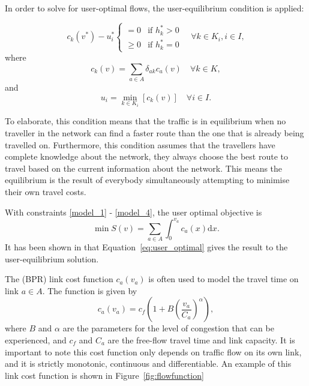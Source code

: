 In order to solve for user-optimal flows,
the \citep{Wardrop} user-equilibrium condition is applied:

\begin{equation} \label{wardrop1}
    c_k(v^{\ast}) - u_i^{\ast} 
    \begin{cases}
        =0 & \text{if } h_k^{\ast} > 0 \\
        \geq 0 & \text{if } h_k^{\ast} = 0
    \end{cases}
    \quad \forall k \in K_i, i \in I,
\end{equation}
where 
\begin{equation}
    c_k(v) = \sum_{a \in A} \delta_{ak} c_a(v) \quad \forall k \in K,
\end{equation}
and
\begin{equation} \label{wardrop3}
    u_i = \min_{k \in K_i} \left[ c_k(v) \right] \quad \forall i \in I.
\end{equation}

To elaborate, this condition means that the traffic is in equilibrium when no traveller in the network can find a faster route than the one that is already being travelled on.
Furthermore, this condition assumes that the travellers have complete knowledge about the network,
they always choose the best route to travel based on the current information about the network.
This means the equilibrium is the result of everybody simultaneously attempting to minimise their own travel costs.

With constraints \eqref{model_1} - \eqref{model_4},
the user optimal objective is
\begin{equation} \label{eq:user_optimal}
    \min S(v) = \sum_{a\in A} \int_0^{v_a} c_a(x) \mathrm{d} x.
\end{equation}
It has been shown in \citet{Florian} that Equation~\ref{eq:user_optimal} gives the result to the user-equilibrium solution.

The \citet{BPR} (BPR) link cost function
$c_a(v_a)$ is often used to model the travel time on link $a \in A$.
The function is given by
\begin{equation}
    c_a(v_a) = c_f \left(1 + B \left( \frac{v_a}{C_a} \right)^\alpha \right),
\end{equation}
where $B$ and $\alpha$ are the parameters for the level of congestion that can be experienced,
and $c_f$ and $C_a$ are the free-flow travel time and link capacity.
It is important to note this cost function only depends on traffic flow on its own link, and it is strictly monotonic, continuous and differentiable.
An example of this link cost function is shown in Figure~\ref{fig:flowfunction}

